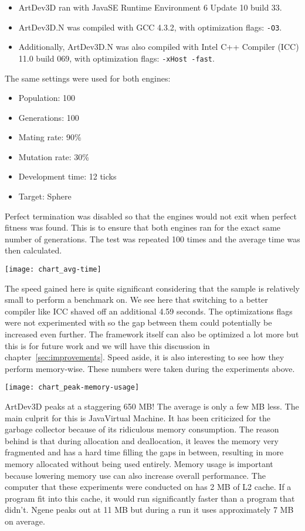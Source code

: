 \begin{itemize}
	\itemsep=0pt
	\item ArtDev3D ran with Java\texttrademark SE Runtime Environment 6 Update 10 build 33.
	\item ArtDev3D.N was compiled with GCC 4.3.2, with optimization flags: \texttt{-O3}.
	\item Additionally, ArtDev3D.N was also compiled with Intel C++ Compiler (ICC) 11.0 build 069, with optimization flags: \texttt{-xHost -fast}.
\end{itemize}

The same settings were used for both engines:

\begin{itemize}
	\itemsep=-2pt
	\item Population: 100
	\item Generations: 100
	\item Mating rate: 90\%
	\item Mutation rate: 30\%
	\item Development time: 12 ticks
	\item Target: Sphere
\end{itemize}

Perfect termination was disabled so that the engines would not exit when perfect fitness was found. This is to ensure that both engines ran for the exact same number of generations. The test was repeated 100 times and the average time was then calculated.

\begin{center}\texttt{[image: chart\_avg-time]}\end{center}

The speed gained here is quite significant considering that the sample is relatively small to perform a benchmark on. We see here that switching to a better compiler like ICC shaved off an additional 4.59 seconds. The optimizations flags were not experimented with so the gap between them could potentially be increased even further. The framework itself can also be optimized a lot more but this is for future work and we will have this discussion in chapter~\ref{sec:improvements}. Speed aside, it is also interesting to see how they perform memory-wise. These numbers were taken during the experiments above.

\begin{center}\texttt{[image: chart\_peak-memory-usage]}\end{center}

ArtDev3D peaks at a staggering 650 MB! The average is only a few MB less. The main culprit for this is Java\texttrademark Virtual Machine. It has been criticized\cite{maio2008} for the garbage collector because of its ridiculous memory consumption. The reason behind is that during allocation and deallocation, it leaves the memory very fragmented and has a hard time filling the gaps in between, resulting in more memory allocated without being used entirely. Memory usage is important because lowering memory use can also increase overall performance. The computer that these experiments were conducted on has 2 MB of L2 cache. If a program fit into this cache, it would run significantly faster than a program that didn't. Ngene peaks out at 11 MB but during a run it uses approximately 7 MB on average.
